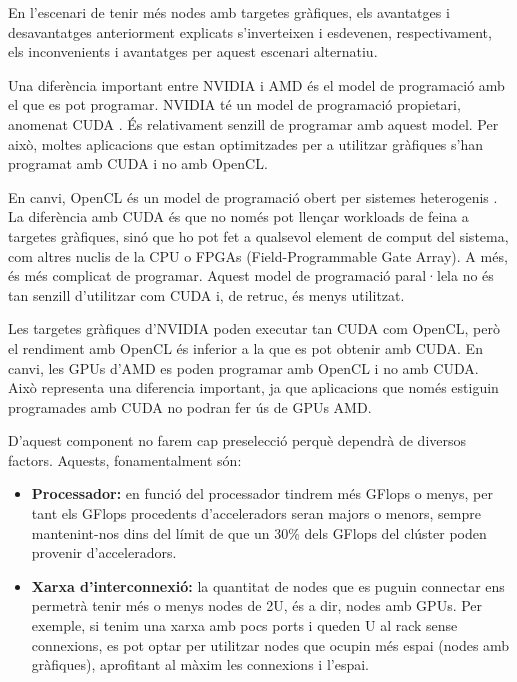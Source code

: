 En l'escenari de tenir més nodes amb targetes gràfiques, els avantatges i desavantatges anteriorment explicats s'inverteixen i esdevenen, respectivament, els inconvenients i avantatges per aquest escenari alternatiu.

Una diferència important entre NVIDIA i AMD és el model de programació amb el que es pot programar. NVIDIA té un model de programació propietari, anomenat CUDA \cite{gpu_cuda}. És relativament senzill de programar amb aquest model. Per això, moltes aplicacions que estan optimitzades per a utilitzar gràfiques s'han programat amb CUDA i no amb OpenCL.

En canvi, OpenCL és un model de programació obert per sistemes heterogenis \cite{gpu_opencl}. La diferència amb CUDA és que no només pot llençar workloads de feina a targetes gràfiques, sinó que ho pot fet a qualsevol element de comput del sistema, com altres nuclis de la CPU o FPGAs (Field-Programmable Gate Array). A més, és més complicat de programar. %
Aquest model de programació paral·lela no és tan senzill d'utilitzar com CUDA i, de retruc, és menys utilitzat.

Les targetes gràfiques d'NVIDIA poden executar tan CUDA com OpenCL, però el rendiment amb OpenCL és inferior a la que es pot obtenir amb CUDA. En canvi, les GPUs d'AMD es poden programar amb OpenCL i no amb CUDA. 
Això representa una diferencia important, ja que aplicacions que només estiguin programades amb CUDA no podran fer ús de GPUs AMD.

D'aquest component no farem cap preselecció perquè dependrà de diversos factors. Aquests, fonamentalment són: 
\begin{itemize}
    \item \textbf{Processador:} en funció del processador tindrem més GFlops o menys, per tant els GFlops procedents d'acceleradors seran majors o menors, sempre mantenint-nos dins del límit de que un 30\% dels GFlops del clúster poden provenir d'acceleradors.
    \item \textbf{Xarxa d'interconnexió:} la quantitat de nodes que es puguin connectar ens permetrà tenir més o menys nodes de 2U, és a dir, nodes amb GPUs. Per exemple, si tenim una xarxa amb pocs ports i queden U al rack sense connexions, es pot optar per utilitzar nodes que ocupin més espai (nodes amb gràfiques), aprofitant al màxim les connexions i l'espai.
\end{itemize}


